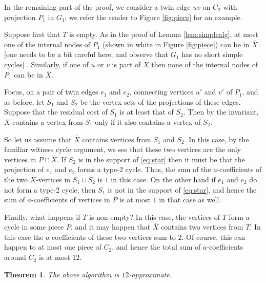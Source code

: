 \documentclass{article}
\newcommand{\comment}[1]{[\begingroup\color{red!60!black}#1\endgroup]
   \marginpar{\tiny\textsc{{\color{red!60!black} To Do!}}}}
\newcommand{\0}{\mathbb{0}}
\newcommand{\1}{\mathbb{1}}
\newtheorem{theorem}{Theorem}[section]
\begin{document}
In the remaining part of the proof, we consider a twin edge $uv$ on $C_2$ with projection
$P_1$ in $G_1$; we refer the reader to Figure \ref{fig:piece} for an example. 

Suppose first that $T$ is empty.
As in the proof of Lemma \ref{lem:simplealg}, at most one of the internal nodes of $P_1$ 
(shown in white in Figure \ref{fig:piece}) can be in $\bar{X}$ \comment{one needs to be a
bit
careful here, and observe that $G_1$ has no short simple cycles}. Similarly, if one of
$u$ or $v$
is part of $\bar{X}$ then none of the internal nodes of $P_1$ can be in $\bar{X}$. 

Focus, on a pair of
twin edges $e_1$ and $e_2$, connecting vertices $u'$ and $v'$ of $P_1$, and as before,
let $S_1$ and $S_2$ be the vertex sets of the projections of these edges. 
Suppose that
the residual cost of $S_1$ is at least that of
$S_2$. Then by the invariant, $X$ contains a vertex from $S_1$ only if it also contains a
vertex of $S_2$. 

So let us assume that $\bar{X}$ contains vertices from $S_1$ and $S_2$. In this case, by
the
familiar witness cycle argument, we see that these two vertices are the only
vertices in $P \cap \bar{X}$. If $S_2$ is in the support of \eqref{eq:star} then it must be
that
the projection of $e_1$ and $e_2$ forms a type-2 cycle. Thus, the sum of the
$a$-coefficients
of the two $\bar{X}$-vertices in $S_1 \cup S_2$ is $1$ in this case. On the other hand if
$e_1$
and $e_2$ do not form a type-2 cycle, then $S_1$ is not in the support of \eqref{eq:star},
and hence the sum of $a$-coefficients of vertices in $P$ is at most $1$ in that case as
well. 

Finally, what happens if $T$ is non-empty? In this case, the vertices of $T$ form a cycle
in some piece $P$, and it may happen that $\bar{X}$ contains two vertices from $T$. In
this case the $a$-coefficients of these two vertices sum to $2$. Of course, this can
happen to at most one piece of $C_2$, and hence the total sum of $a$-coefficients around
$C_2$ is at most $12$. 

\begin{theorem}
  The above algorithm is $12$-approximate. 
\end{theorem}























\end{document}
